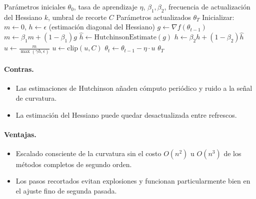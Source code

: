 \begin{algorithm}[H]
\caption{Sophia (Hessiano Diagonal con Actualizaciones Recortadas)}
\label{alg:sophia}
\begin{algorithmic}[1]
\Require Parámetros iniciales $\theta_0$, tasa de aprendizaje $\eta$, $\beta_1, \beta_2$, frecuencia de actualización del Hessiano $k$, umbral de recorte $C$
\Ensure Parámetros actualizados $\theta_T$
\State Inicializar: $m \gets 0$, $h \gets \epsilon$ (estimación diagonal del Hessiano)
    \State $g \gets \nabla f(\theta_{t-1})$
    \State $m \gets \beta_1 m + (1-\beta_1) g$ 
        \State $\hat{h} \gets \text{HutchinsonEstimate}(g)$ 
        \State $h \gets \beta_2 h + (1-\beta_2) \hat{h}$ 
    \EndIf
    \State $u \gets \frac{m}{\max(\gamma h, \epsilon)}$ 
    \State $u \gets \text{clip}(u, C)$ 
    \State $\theta_t \gets \theta_{t-1} - \eta \cdot u$
\EndFor
\Return $\theta_T$
\end{algorithmic}
\end{algorithm}

\paragraph{Contras.}
\begin{itemize}[leftmargin=*]
\item Las estimaciones de Hutchinson añaden cómputo periódico y ruido a la señal de curvatura.
\item La estimación del Hessiano puede quedar desactualizada entre refrescos.
\end{itemize}

\paragraph{Ventajas.}
\begin{itemize}[leftmargin=*]
\item Escalado consciente de la curvatura sin el costo $O(n^2)$ u $O(n^3)$ de los métodos completos de segundo orden.
\item Los pasos recortados evitan explosiones y funcionan particularmente bien en el ajuste fino de segunda pasada.
\end{itemize}

